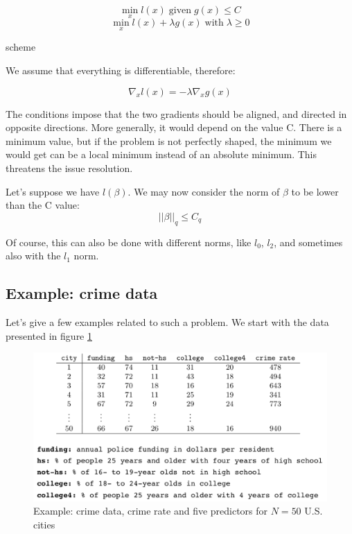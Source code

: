 \begin{equation}
    \min_x l(x) \; \text{given} \; g(x)\leq C
\end{equation}
\begin{equation}
    \min_x l(x) + \lambda g(x) \; \text{with} \; \lambda \geq 0
\end{equation}

\begin{marginfigure}
    \TODO
    \caption{scheme}
    \label{fig3}
\end{marginfigure}

We assume that everything is differentiable, therefore:

\begin{equation}
    \nabla_x l(x) = -\lambda \nabla_x g(x)
\end{equation}

The conditions impose that the two gradients should be aligned, and directed
in opposite directions. More generally, it would depend on the value C.
There is a minimum value, but if the problem is not perfectly shaped, the
minimum we would get can be a local minimum instead of an absolute minimum. This
threatens the issue resolution.

Let's suppose we have $l(\beta)$. We may now consider the norm of $\beta$ to be
lower than the C value:
\begin{equation}
    ||\beta||_q \leq C_q
\end{equation}

Of course, this can also be done with different norms, like $l_0$, $l_2$,
and sometimes also with the $l_1$ norm.

\subsection{Example: crime data}

Let's give a few examples related to such a problem. We start with the data
presented in figure \ref{crime}

\begin{figure}
    \includegraphics{./Figures/crime.png}
    \caption{Example: crime data, crime rate and five predictors for $N=50$ U.S.
    cities}
    \label{crime}
\end{figure}

